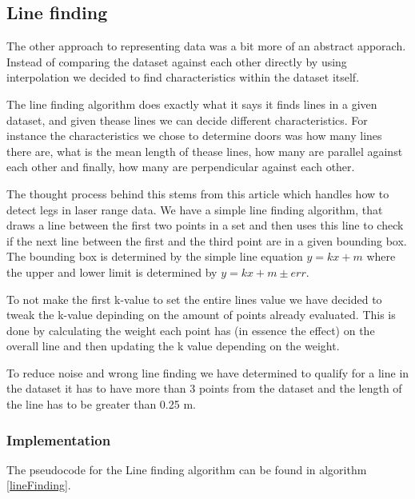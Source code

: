 \documentclass[a4paper, 10pt, conference]{ieeeconf}      %
\begin{document}
\subsection{Line finding}
\label{sec:line_find}
The other approach to representing data was a bit more of an abstract apporach. Instead of comparing the dataset against each other directly by using interpolation we decided to find characteristics within the dataset itself. 

The line finding algorithm does exactly what it says it finds lines in a given dataset, and given thease lines we can decide different characteristics. For instance the characteristics we chose to determine doors was how many lines there are, what is the mean length of thease lines, how many are parallel against each other and finally, how many are perpendicular against each other.

The thought process behind this stems from this article \cite{legfinding} which handles how to detect legs in laser range data. We have a simple line finding algorithm, that draws a line between the first two points in a set and then uses this line to check if the next line between the first and the third point are in a given bounding box. The bounding box is determined by the simple line equation $y = kx + m$ where the upper and lower limit is determined by $y = kx + m \pm err$. 

To not make the first k-value to set the entire lines value we have decided to tweak the k-value depinding on the amount of points already evaluated. This is done by calculating the weight each point has (in essence the effect) on the overall line and then updating the k value depending on the weight.

To reduce noise and wrong line finding we have determined to qualify for a line in the dataset it has to have more than 3 points from the dataset and the length of the line has to be greater than 0.25 m.
\subsubsection{Implementation}
The pseudocode for the Line finding algorithm can be found in algorithm \ref{lineFinding}.
\end{document}
